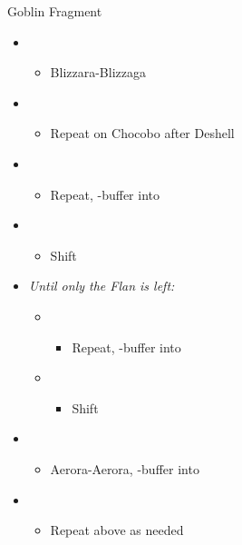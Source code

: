 \begin{battle}{Goblin Fragment}
	\begin{itemize}
		\item \sixth
		      \begin{itemize}
			      \item Blizzara-Blizzaga
		      \end{itemize}
		\item \third
		      \begin{itemize}
			      \item Repeat on Chocobo after Deshell
		      \end{itemize}
		\item \second
		      \begin{itemize}
			      \item Repeat, \com-buffer into
		      \end{itemize}
		\item \first
		      \begin{itemize}
			      \item Shift
		      \end{itemize}
		\item \textit{Until only the Flan is left:}
		      \begin{itemize}
			      \item \sixth
			            \begin{itemize}
				            \item Repeat, \com-buffer into
			            \end{itemize}
			      \item \first
			            \begin{itemize}
				            \item Shift
			            \end{itemize}
		      \end{itemize}
		\item \sixth
		      \begin{itemize}
			      \item Aerora-Aerora, \com-buffer into
		      \end{itemize}
		\item \first
		      \begin{itemize}
			      \item Repeat above as needed
		      \end{itemize}
	\end{itemize}
\end{battle}

